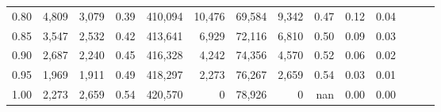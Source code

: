 \begin{tabular}{rrrrrrrrrrrrrr}
0.80 &   4,809 &  3,079 &  0.39 &  410,094 &   10,476 &  69,584 &   9,342 &  0.47 &  0.12 &      0.04 \\
0.85 &   3,547 &  2,532 &  0.42 &  413,641 &    6,929 &  72,116 &   6,810 &  0.50 &  0.09 &      0.03 \\
0.90 &   2,687 &  2,240 &  0.45 &  416,328 &    4,242 &  74,356 &   4,570 &  0.52 &  0.06 &      0.02 \\
0.95 &   1,969 &  1,911 &  0.49 &  418,297 &    2,273 &  76,267 &   2,659 &  0.54 &  0.03 &      0.01 \\
1.00 &   2,273 &  2,659 &  0.54 &  420,570 &        0 &  78,926 &       0 &   nan &  0.00 &      0.00 \\
\bottomrule
\end{tabular}
